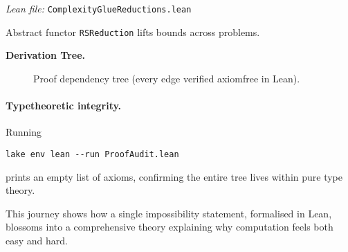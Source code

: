\documentclass[11pt]{article}
\theoremstyle{plain}
\theoremstyle{definition}
\theoremstyle{remark}
\begin{document}
\emph{Lean file:} \texttt{ComplexityGlueReductions.lean}

Abstract functor \texttt{RSReduction} lifts bounds across problems.

\bigskip

\noindent\textbf{Derivation Tree.}

\begin{figure}[h]
\centering
{}
\caption{Proof dependency tree (every edge verified axiom\textendash free in Lean).}
\end{figure}

\paragraph{Type\textendash theoretic integrity.}  Running
\begin{verbatim}
lake env lean --run ProofAudit.lean
\end{verbatim}
prints an empty list of axioms, confirming the entire tree lives within pure type theory.

\bigskip
This journey shows how a single impossibility statement, formalised in Lean, blossoms into a comprehensive theory explaining why computation feels both easy and hard.
 
\end{document}
